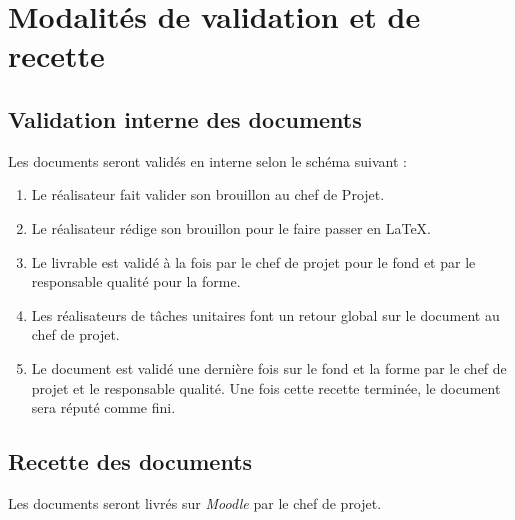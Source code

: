 \section{Modalités de validation et de recette}

\subsection{Validation interne des documents}

Les documents seront validés en interne selon le schéma suivant : 
\begin{enumerate}
\item Le réalisateur fait valider son brouillon au chef de Projet.
\item Le réalisateur rédige son brouillon pour le faire passer en \LaTeX.
\item Le livrable est validé à la fois par le chef de projet pour le fond et
    par le responsable qualité pour la forme.
\item Les réalisateurs de tâches unitaires font un retour global sur le document
    au chef de projet.
\item Le document est validé une dernière fois sur le fond et la forme par le
    chef de projet et le responsable qualité. Une fois cette recette terminée,
    le document sera réputé comme fini.
\end{enumerate} 

\subsection{Recette des documents}

Les documents seront livrés sur \textsl{Moodle} par le chef de projet. 

